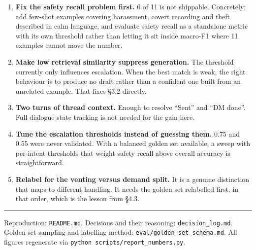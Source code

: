 \documentclass[11pt,a4paper]{article}
\begin{document}
\begin{enumerate}
\item \textbf{Fix the safety recall problem first.} 6 of 11 is not shippable. Concretely:
add few-shot examples covering harassment, covert recording and theft described in calm
language, and evaluate safety recall as a standalone metric with its own threshold rather
than letting it sit inside macro-F1 where 11 examples cannot move the number.
\item \textbf{Make low retrieval similarity suppress generation.} The threshold currently
only influences escalation. When the best match is weak, the right behaviour is to
produce no draft rather than a confident one built from an unrelated example. That fixes
\S3.2 directly.
\item \textbf{Two turns of thread context.} Enough to resolve ``Sent'' and ``DM done''.
Full dialogue state tracking is not needed for the gain here.
\item \textbf{Tune the escalation thresholds instead of guessing them.} 0.75 and 0.55
were never validated. With a balanced golden set available, a sweep with per-intent
thresholds that weight safety recall above overall accuracy is straightforward.
\item \textbf{Relabel for the venting versus demand split.} It is a genuine distinction
that maps to different handling. It needs the golden set relabelled first, in that order,
which is the lesson from \S4.3.
\end{enumerate}

\vspace{1em}
\noindent\rule{\textwidth}{0.4pt}
\footnotesize
Reproduction: \texttt{README.md}. Decisions and their reasoning: \texttt{decision\_log.md}.
Golden set sampling and labelling method: \texttt{eval/golden\_set\_schema.md}.
All figures regenerate via \texttt{python scripts/report\_numbers.py}.
\end{document}

